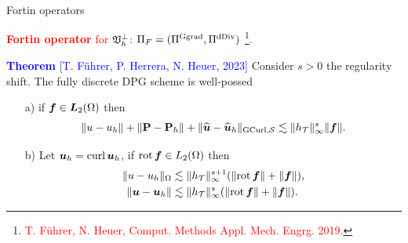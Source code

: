 \documentclass[10pt, compress]{beamer}
\begin{document}
\begin{frame}{Fortin operators}
   
    \textcolor{red}{\textbf{Fortin operator} for $\mathfrak{V}^\perp_h$: $\Pi_F =(\Pi^{\mathrm{Ggrad}},\Pi^{\mathrm{dDiv}})$ \footnote[1]{\textcolor{red}{T. F\"uhrer, N. Heuer, Comput. Methods Appl. Mech. Engrg. 2019.}  }. }\vspace{1em}

    \textcolor{blue}{\textbf{Theorem} [T. F\"uhrer, P. Herrera, N. Heuer, 2023]} Consider $s>0$ the regularity shift. The fully discrete DPG scheme is well-possed %
    \begin{itemize}
        \item[a)] if $\boldsymbol{f} \in \boldsymbol{L}_2(\Omega)$ then 
        \begin{align*}
            \|u-u_h\|+\|\mathbf{P}-\mathbf{P}_h\|+\|\widehat{\boldsymbol{u}}-\widehat{\boldsymbol{u}}_h\|_{\mathrm{GCurl},\mathcal{S}} \lesssim \|h_{\mathcal{T}}\|_{\infty}^s\|\boldsymbol{f}\|. 
        \end{align*}
        \item[b)] Let $\boldsymbol{u}_h={\rm curl\,} \boldsymbol{u}_h$,  if ${\rm rot\,} \boldsymbol{f} \in L_2(\Omega)$ then 
        \begin{align*}
            \|u-u_h\|_{\Omega} &\lesssim \|h_{\mathcal{T}}\|_{\infty}^{s+1} (\|{\rm rot\,} \boldsymbol{f}\| +\|\boldsymbol{f}\|), \\
            \|\boldsymbol{u}-\boldsymbol{u}_h\| &\lesssim  \|h_{\mathcal{T}}\|_{\infty}^{s} (\|{\rm rot\,} \boldsymbol{f}\|+\|\boldsymbol{f}\|).
        \end{align*}
    
    \end{itemize}
        
\end{frame}
\end{document}
